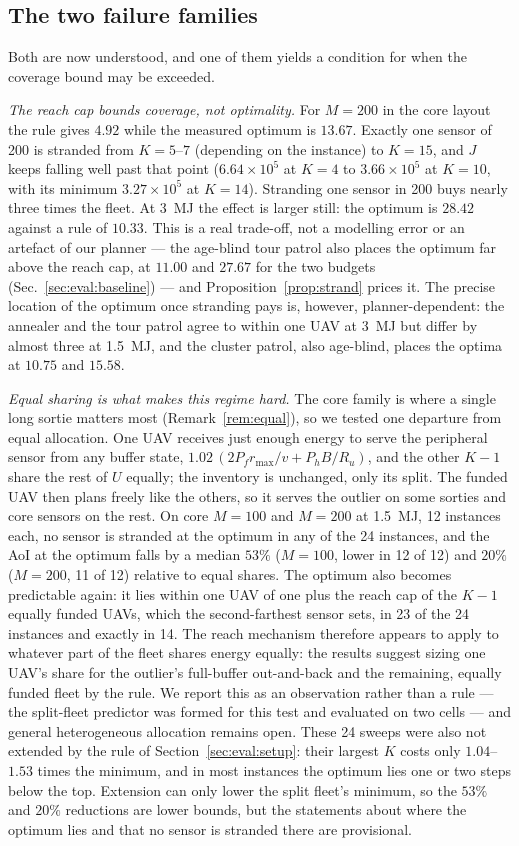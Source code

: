 \documentclass[journal,outdir=./]{IEEEtran}
\newcommand{\rmax}{r_{\max}}
\newcommand{\Pf}{P_{f}}
\newcommand{\Ph}{P_{h}}
\newcommand{\Ru}{R_u}
\begin{document}
\subsection{The two failure families}\label{sec:eval:fail}
Both are now understood, and one of them yields a condition for when the coverage bound may be exceeded.

\textit{The reach cap bounds coverage, not optimality.} For $M=200$ in the core layout the rule gives $4.92$ while the measured optimum is $13.67$. Exactly one sensor of 200 is stranded from $K=5$--$7$ (depending on the instance) to $K=15$, and $J$ keeps falling well past that point ($6.64\times10^5$ at $K=4$ to $3.66\times10^5$ at $K=10$, with its minimum $3.27\times10^5$ at $K=14$). Stranding one sensor in 200 buys nearly three times the fleet. At 3~MJ the effect is larger still: the optimum is $28.42$ against a rule of $10.33$. This is a real trade-off, not a modelling error or an artefact of our planner --- the age-blind tour patrol also places the optimum far above the reach cap, at $11.00$ and $27.67$ for the two budgets (Sec.~\ref{sec:eval:baseline}) --- and Proposition~\ref{prop:strand} prices it. The precise location of the optimum once stranding pays is, however, planner-dependent: the annealer and the tour patrol agree to within one UAV at 3~MJ but differ by almost three at 1.5~MJ, and the cluster patrol, also age-blind, places the optima at $10.75$ and $15.58$.

\textit{Equal sharing is what makes this regime hard.} The core family is where a single long sortie matters most (Remark~\ref{rem:equal}), so we tested one departure from equal allocation. One UAV receives just enough energy to serve the peripheral sensor from any buffer state, $1.02\,(2\Pf\rmax/v+\Ph B/\Ru)$, and the other $K-1$ share the rest of $U$ equally; the inventory is unchanged, only its split. The funded UAV then plans freely like the others, so it serves the outlier on some sorties and core sensors on the rest. On core $M=100$ and $M=200$ at 1.5~MJ, 12 instances each, no sensor is stranded at the optimum in any of the 24 instances, and the AoI at the optimum falls by a median $53\%$ ($M=100$, lower in 12 of 12) and $20\%$ ($M=200$, 11 of 12) relative to equal shares. The optimum also becomes predictable again: it lies within one UAV of one plus the reach cap of the $K-1$ equally funded UAVs, which the second-farthest sensor sets, in 23 of the 24 instances and exactly in 14. The reach mechanism therefore appears to apply to whatever part of the fleet shares energy equally: the results suggest sizing one UAV's share for the outlier's full-buffer out-and-back and the remaining, equally funded fleet by the rule. We report this as an observation rather than a rule --- the split-fleet predictor was formed for this test and evaluated on two cells --- and general heterogeneous allocation remains open. These 24 sweeps were also not extended by the rule of Section~\ref{sec:eval:setup}: their largest $K$ costs only $1.04$--$1.53$ times the minimum, and in most instances the optimum lies one or two steps below the top. Extension can only lower the split fleet's minimum, so the $53\%$ and $20\%$ reductions are lower bounds, but the statements about where the optimum lies and that no sensor is stranded there are provisional.
\end{document}
